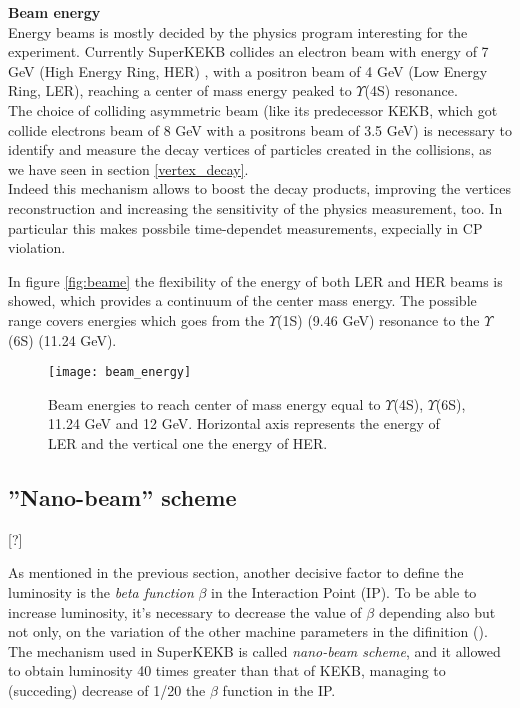\hspace{.2cm}


\textbf{Beam energy}\\

Energy beams is mostly decided by the physics program interesting for the experiment. Currently SuperKEKB collides an electron beam with energy of 7 GeV (High Energy Ring, HER) , with a positron beam of 4 GeV (Low Energy Ring, LER), reaching a center of mass energy peaked to $\Upsilon$(4S) resonance.\\
The choice of colliding asymmetric beam (like its predecessor KEKB, which got collide electrons beam of 8 GeV with a positrons beam of 3.5 GeV) is necessary to identify and measure the decay vertices of particles created in the collisions, as we have seen in section \vref{vertex_decay}.\\
Indeed this mechanism allows to boost the decay products, improving the vertices reconstruction and increasing the sensitivity of the physics measurement, too. In particular this makes possbile time-dependet measurements, expecially in CP violation.


In figure \vref{fig:beame} the flexibility of the energy of both LER and HER beams is showed, which provides a continuum of the center mass energy. The possible range covers energies which goes from the $\Upsilon$(1S) (9.46 GeV) resonance to the $\Upsilon$(6S) (11.24 GeV).

\begin{figure}
\centering
\texttt{[image: beam\_energy]}
\caption{Beam energies to reach center of mass energy equal to $\Upsilon$(4S), $\Upsilon$(6S), 11.24 GeV and 12 GeV. Horizontal axis represents the energy of LER and the vertical one the energy of HER. }
\label{fig:beame}
\end{figure}



\subsection{''Nano-beam'' scheme} [?] \label{nano_beam}

As mentioned in the previous section, another decisive factor to define the luminosity is the \textit{beta function} $\beta$ in the Interaction Point (IP). To be able to increase luminosity, it's necessary to decrease the value of $\beta$ depending also but not only, on the variation of the other machine parameters in the difinition ().
The mechanism used in SuperKEKB is called \textit{nano-beam scheme}, and it allowed to obtain luminosity 40 times greater than that of KEKB, managing to (succeding) decrease of 1/20 the $\beta$ function in the IP.\\

